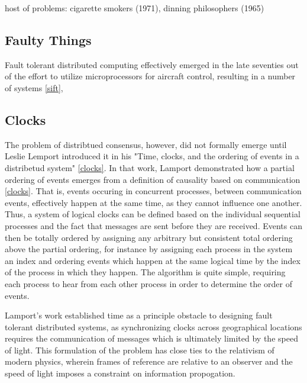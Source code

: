 host of problems: cigarette smokers (1971), dinning philosophers (1965)

\subsection{Faulty Things}


Fault tolerant distributed computing effectively emerged in the late seventies out of the effort to utilize microprocessors for aircraft control, resulting in a number of systems \ref{sift}, 


\subsection{Clocks}

The problem of distribtued consensus, however, did not formally emerge until Leslie Lemport introduced it in his 
"Time, clocks, and the ordering of events in a distribetud system" \ref{clocks}.
In that work, Lamport demonstrated how a partial ordering of events emerges from a definition of causality based on communication \ref{clocks}.
That is, events occuring in concurrent processes, between communication events, effectively happen at the same time, as they cannot influence one another.
Thus, a system of logical clocks can be defined based on the individual sequential processes and the fact that messages are sent before they are received.
Events can then be totally ordered by assigning any arbitrary but consistent total ordering above the partial ordering,
for instance by assigning each process in the system an index and ordering events which happen at the same logical time by the
index of the process in which they happen.
The algorithm is quite simple, requiring each process to hear from each other process in order to determine the order of events.

Lamport's work established time as a principle obstacle to designing fault tolerant distributed systems,
as synchronizing clocks across geographical locations requires the communication of messages which is ultimately limited by the speed of light.
This formulation of the problem has close ties to the relativism of modern physics,
wherein frames of reference are relative to an observer and the speed of light imposes a constraint on information propogation.

